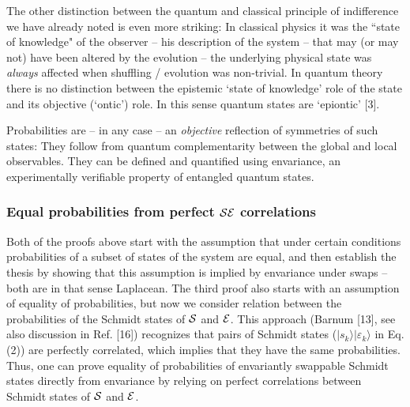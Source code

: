 \documentclass[aps,twocolumn,pra,epsfig]{revtex4}
\begin{document}
The other distinction between the quantum and classical principle of indifference 
we have already noted is even more striking: In classical physics it was the
``state of knowledge" of the observer -- his description of the system -- that may 
(or may not) have been altered by the evolution -- the underlying physical state 
was {\it always} affected when shuffling / evolution was non-trivial.
In quantum theory there is no distinction between the epistemic `state of
knowledge' role of the state and its objective (`ontic') role. In this sense quantum 
states are `epiontic' [3]. 

Probabilities are -- in any case -- an {\it objective} reflection of symmetries of 
such states: They follow from quantum complementarity between the global
and local observables. They can be defined and quantified using envariance, 
an experimentally verifiable property of entangled quantum states.

\subsubsection{Equal probabilities from perfect ${\cal SE}$ correlations}

Both of the proofs above start with the assumption that under certain conditions
probabilities of a subset of states of the system are equal, and then establish
the thesis by showing that this assumption is implied by envariance under swaps
-- both are in that sense Laplacean. The third proof also starts with
an assumption of equality of probabilities, but now we consider relation
between the probabilities of the Schmidt states of ${\cal S}$ and ${\cal E}$.
This approach (Barnum [13], see also discussion in Ref. [16])
recognizes that pairs of Schmidt states ($|s_k\rangle|\varepsilon_k\rangle$
in Eq. (2)) are perfectly correlated, which implies that they have the same
probabilities. Thus, one can prove equality of probabilities
of envariantly swappable Schmidt states directly from envariance by relying
on perfect correlations between Schmidt states of ${\cal S}$ and ${\cal E}$.
\end{document}
